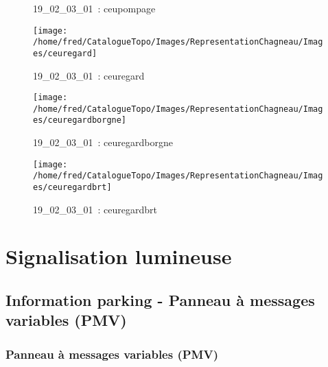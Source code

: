 \documentclass[12pt,titlepage]{book}
\begin{document}
\begin{figure}[h!]
\begin{minipage}[t]{3cm}
\begin{center}
      \caption[~19\_02\_03\_01]{\small{19\_02\_03\_01~:} \tiny{ceupompage}}\label{ceupompage}
    \end{center}
  \end{minipage}
  \begin{minipage}[t]{3cm}
    \begin{center}
      \texttt{[image: /home/fred/CatalogueTopo/Images/RepresentationChagneau/Images/ceuregard]}
      \caption[~19\_02\_03\_01]{\small{19\_02\_03\_01~:} \tiny{ceuregard}}\label{ceuregard}
    \end{center}
  \end{minipage}
  \begin{minipage}[t]{3cm}
    \begin{center}
      \texttt{[image: /home/fred/CatalogueTopo/Images/RepresentationChagneau/Images/ceuregardborgne]}
      \caption[~19\_02\_03\_01]{\small{19\_02\_03\_01~:} \tiny{ceuregardborgne}}\label{ceuregardborgne}
    \end{center}
  \end{minipage}
  \begin{minipage}[t]{3cm}
    \begin{center}
      \texttt{[image: /home/fred/CatalogueTopo/Images/RepresentationChagneau/Images/ceuregardbrt]}
      \caption[~19\_02\_03\_01]{\small{19\_02\_03\_01~:} \tiny{ceuregardbrt}}\label{ceuregardbrt}
    \end{center}
  \end{minipage}
\end{figure}
\chapter{Signalisation lumineuse}
\section{\large Information parking - Panneau à messages variables (PMV)}
\subsection{Panneau à messages variables (PMV)}
\noindent
\vspace{\baselineskip}
\end{document}

